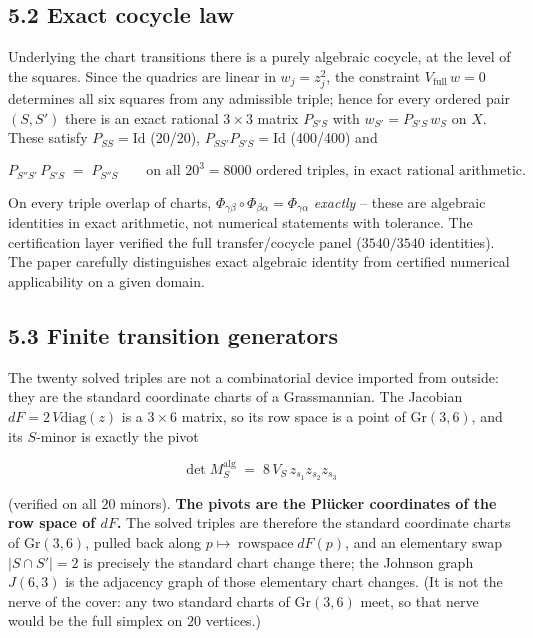 \subsection{5.2 Exact cocycle law}\label{exact-cocycle-law}

Underlying the chart transitions there is a purely algebraic cocycle, at the level of the squares. Since the quadrics are linear in \(w_j = z_j^2\), the constraint \(V_{\mathrm{full}}\, w = 0\) determines all six squares from any admissible triple; hence for every ordered pair \((S, S')\) there is an exact rational \(3 \times 3\) matrix \(P_{S'S}\) with \(w_{S'} = P_{S'S}\, w_S\) on \(X\). These satisfy \(P_{SS} = \mathrm{Id}\) (20/20), \(P_{SS'} P_{S'S} = \mathrm{Id}\) (400/400) and

\[P_{S''S'}\, P_{S'S} \;=\; P_{S''S} \qquad\text{on all } 20^3 = 8000
\text{ ordered triples, in exact rational arithmetic.}\]

On every triple overlap of charts, \(\Phi_{\gamma\beta} \circ \Phi_{\beta\alpha} = \Phi_{\gamma\alpha}\) \emph{exactly} -- these are algebraic identities in exact arithmetic, not numerical statements with tolerance. The certification layer verified the full transfer/cocycle panel (\(3540/3540\) identities). The paper carefully distinguishes exact algebraic identity from certified numerical applicability on a given domain.

\subsection{5.3 Finite transition generators}\label{finite-transition-generators}

The twenty solved triples are not a combinatorial device imported from outside: they are the standard coordinate charts of a Grassmannian. The Jacobian \(dF = 2\,V \mathrm{diag}(z)\) is a \(3 \times 6\) matrix, so its row space is a point of \(\mathrm{Gr}(3,6)\), and its \(S\)-minor is exactly the pivot

\[\det M_S^{\mathrm{alg}} \;=\; 8\, V_S\, z_{s_1} z_{s_2} z_{s_3}\]

(verified on all \(20\) minors). \textbf{The pivots are the Plücker coordinates of the row space of \(dF\).} The solved triples are therefore the standard coordinate charts of \(\mathrm{Gr}(3,6)\), pulled back along \(p \mapsto \operatorname{rowspace} dF(p)\), and an elementary swap \(|S \cap S'| = 2\) is precisely the standard chart change there; the Johnson graph \(J(6,3)\) is the adjacency graph of those elementary chart changes. (It is not the nerve of the cover: any two standard charts of \(\mathrm{Gr}(3,6)\) meet, so that nerve would be the full simplex on \(20\) vertices.)

